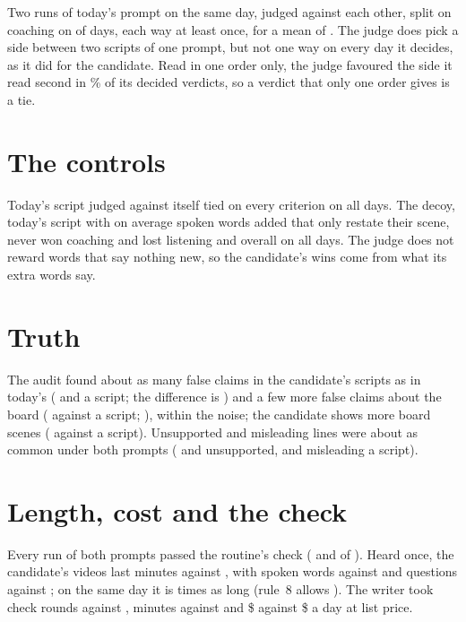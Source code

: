 \documentclass[11pt]{article}
\begin{document}
Two runs of today's prompt on the same day, judged against each other, split on coaching on
\NullDecisive{} of \NullN{} days, each way at least once, for a mean of \AllNullCoaching. The judge
does pick a side between two scripts of one prompt, but not one way on every day it decides, as it
did for the candidate. Read in one order only, the judge favoured the side it read second in \SecondShare\% of
its \Decided{} decided verdicts, so a verdict that only one order gives is a tie.

\section{The controls}

Today's script judged against itself tied on every criterion on all \SameN{} days. The decoy,
today's script with on average \DecoyAdded{} spoken words added that only restate their scene, never
won coaching and lost listening and overall on all \DecoyN{} days. The judge does not
reward words that say nothing new, so the candidate's wins come from what its extra words say.

\section{Truth}

The audit found about as many false claims in the candidate's scripts as in today's (\CandFalse{} and
\BaseFalse{} a script; the difference is \FalseDiff) and a few more false claims about the board
(\CandBoardFalse{} against \BaseBoardFalse{} a script; \BoardDiff), within the noise; the candidate
shows more board scenes (\CandBoardScenes{} against \BaseBoardScenes{} a script). Unsupported and
misleading lines were about as common under both prompts (\CandUnsupported{} and
\BaseUnsupported{} unsupported, \CandMisleading{} and \BaseMisleading{} misleading a script).

\section{Length, cost and the check}

Every run of both prompts passed the routine's check (\CandPassed{} and \BasePassed{} of
\Cases). Heard once, the candidate's videos last \CandHeard{} minutes against \BaseHeard{}, with
\CandWords{} spoken words against \BaseWords{} and \CandQuestions{} questions against
\BaseQuestions; on the same day it is \LengthRatioInterval{} times as long (rule~8 allows
\LengthCap). The
writer took \CandRounds{} check rounds against \BaseRounds, \CandMinutes{} minutes against
\BaseMinutes{} and \$\CandCost{} against \$\BaseCost{} a day at list price.
\end{document}
